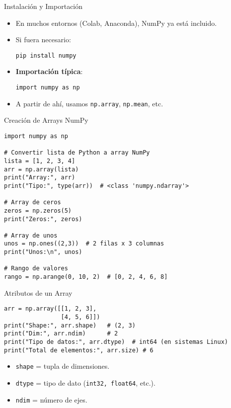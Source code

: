 \documentclass[10pt]{beamer}
\begin{document}
\begin{frame}[fragile]{Instalación y Importación}
  \begin{itemize}
    \item En muchos entornos (Colab, Anaconda), NumPy ya está incluido.
    \item Si fuera necesario:
\begin{verbatim}
pip install numpy
\end{verbatim}
    \item \textbf{Importación típica}:
\begin{verbatim}
import numpy as np
\end{verbatim}
    \item A partir de ahí, usamos \texttt{np.array}, \texttt{np.mean}, etc.
  \end{itemize}
\end{frame}

\begin{frame}[fragile]{Creación de Arrays NumPy}
\begin{verbatim}
import numpy as np

# Convertir lista de Python a array NumPy
lista = [1, 2, 3, 4]
arr = np.array(lista)
print("Array:", arr)
print("Tipo:", type(arr))  # <class 'numpy.ndarray'>

# Array de ceros
zeros = np.zeros(5)
print("Zeros:", zeros)

# Array de unos
unos = np.ones((2,3))  # 2 filas x 3 columnas
print("Unos:\n", unos)

# Rango de valores
rango = np.arange(0, 10, 2)  # [0, 2, 4, 6, 8]
\end{verbatim}
\end{frame}

\begin{frame}[fragile]{Atributos de un Array}
\begin{verbatim}
arr = np.array([[1, 2, 3],
                [4, 5, 6]])
print("Shape:", arr.shape)   # (2, 3)
print("Dim:", arr.ndim)      # 2
print("Tipo de datos:", arr.dtype)  # int64 (en sistemas Linux)
print("Total de elementos:", arr.size) # 6
\end{verbatim}
\begin{itemize}
  \item \texttt{shape} = tupla de dimensiones.
  \item \texttt{dtype} = tipo de dato (\texttt{int32, float64}, etc.).
  \item \texttt{ndim} = número de ejes.
\end{itemize}
\end{frame}
\end{document}
